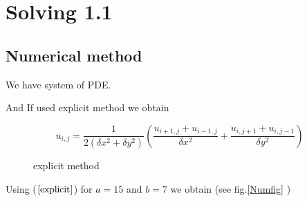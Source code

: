 

\section*{Solving 1.1}

\subsection*{Numerical method}
We have system of PDE.

And If used explicit method we obtain 

\begin{equation}\label{explicit}
    u_{i, j} = \frac{1}{2(\delta x^2 + \delta y^2)} \left(\frac{u_{i+1,j} + u_{i-1,j}}{\delta x^2} + \frac{u_{i,j+1} + u_{i,j-1}}{\delta y^2}\right) 
\end{equation}

\begin{figure}[h!]
\caption{explicit method}
\end{figure}

Using ($\ref{explicit}$)  for $a=15$ and $b=7$ we obtain (see fig.\ref{Numfig} ) 

